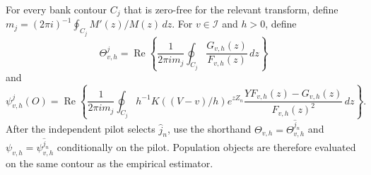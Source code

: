 For every bank contour \(C_j\) that is zero-free for the relevant transform, define \(m_j=(2\pi i)^{-1}\oint_{C_j}M'(z)/M(z)\,dz\).  For \(v\in\mathcal I\) and \(h>0\), define
\[
 \Theta^{j}_{v,h}=\operatorname{Re}\left\{\frac{1}{2\pi i m_j}\oint_{C_j}\frac{G_{v,h}(z)}{F_{v,h}(z)}\,dz\right\}
\]
and
\[
 \psi^{j}_{v,h}(O)=\operatorname{Re}\left\{\frac{1}{2\pi i m_j}\oint_{C_j}h^{-1}K((V-v)/h)e^{zZ_n}\frac{YF_{v,h}(z)-G_{v,h}(z)}{F_{v,h}(z)^2}\,dz\right\}.
\]
After the independent pilot selects \(\widehat j_n\), use the shorthand \(\Theta_{v,h}=\Theta^{\widehat j_n}_{v,h}\) and \(\psi_{v,h}=\psi^{\widehat j_n}_{v,h}\) conditionally on the pilot.  Population objects are therefore evaluated on the same contour as the empirical estimator.